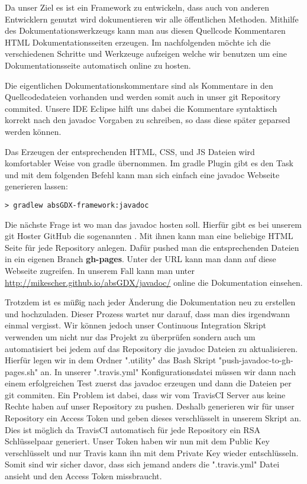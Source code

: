 
Da unser Ziel es ist ein Framework zu entwickeln, dass auch von anderen Entwicklern genutzt wird dokumentieren wir alle öffentlichen Methoden. Mithilfe des Dokumentationswerkzeugs  kann man aus diesen Quellcode Kommentaren HTML Dokumentationsseiten erzeugen. Im nachfolgenden möchte ich die verschiedenen Schritte und Werkzeuge aufzeigen welche wir benutzen um eine Dokumentationsseite automatisch online zu hosten.

Die eigentlichen Dokumentationskommentare sind als Kommentare in den Quellcodedateien vorhanden und werden somit auch in unser git Repository commited. Unsere IDE Eclipse hilft uns dabei die Kommentare syntaktisch korrekt nach den javadoc Vorgaben zu schreiben, so dass diese später geparsed werden können.

Das Erzeugen der entsprechenden HTML, CSS, und JS Dateien wird komfortabler Weise von gradle übernommen. Im gradle Plugin  gibt es den Task  und mit dem folgenden Befehl kann man sich einfach eine javadoc Webseite generieren lassen: 

\doinlineII
\begin{lstlisting}[caption=Gradle in der Kommandozeile, title=\hspace{0 pt}, style=cmd]
> gradlew absGDX-framework:javadoc
\end{lstlisting}

Die nächste Frage ist wo man das javadoc hosten soll. Hierfür gibt es bei unserem git Hoster GitHub die sogenannten . Mit ihnen kann man eine beliebige HTML Seite für jede Repository anlegen. Dafür pushed man die entsprechenden Dateien in ein eigenen Branch \textbf{gh-pages}. Unter der URL  kann man dann auf diese Webseite zugreifen. In unserem Fall kann man unter \href{http://mikescher.github.io/absGDX/javadoc/}{http://mikescher.github.io/absGDX/javadoc/} online die Dokumentation einsehen.

Trotzdem ist es müßig nach jeder Änderung die Dokumentation neu zu erstellen und hochzuladen. Dieser Prozess wartet nur darauf, dass man dies irgendwann einmal vergisst.
Wir können jedoch unser Continuous Integration Skript verwenden um nicht nur das Projekt zu überprüfen sondern auch um automatisiert bei jedem  auf das Repository die javadoc Dateien zu aktualisieren.
Hierfür legen wir in dem Ordner ".utility" das Bash Skript "push-javadoc-to-gh-pages.sh" an. In unserer ".travis.yml" Konfigurationsdatei müssen wir dann nach einem erfolgreichen Test zuerst das javadoc erzeugen und dann die Dateien per git commiten. Ein Problem ist dabei, dass wir vom TravisCI Server aus keine Rechte haben auf unser Repository zu pushen. Deshalb generieren wir für unser Repository ein Access Token und geben dieses verschlüsselt in unserem Skript an. Dies ist möglich da TravisCI automatisch für jede Repository ein RSA Schlüsselpaar generiert. Unser Token haben wir nun mit dem Public Key verschlüsselt und nur Travis kann ihn mit dem Private Key wieder entschlüsseln. Somit sind wir sicher davor, dass sich jemand anders die  ".travis.yml" Datei ansieht und den Access Token missbraucht.


